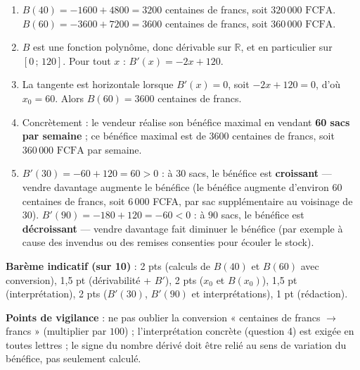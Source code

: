 \documentclass[11pt]{article}
\begin{document}
\begin{corrige}
\begin{enumerate}
\item $B(40)=-1600+4800=3200$ centaines de francs, soit $\boxed{320\,000\text{ FCFA}}$. $B(60)=-3600+7200=3600$ centaines de francs, soit $\boxed{360\,000\text{ FCFA}}$.
\item $B$ est une fonction polynôme, donc dérivable sur $\mathbb{R}$, et en particulier sur $[0\,;\,120]$. Pour tout $x$ : $B'(x)=-2x+120$.
\item La tangente est horizontale lorsque $B'(x)=0$, soit $-2x+120=0$, d'où $x_0=60$. Alors $B(60)=3600$ centaines de francs.
\item Concrètement : le vendeur réalise son bénéfice maximal en vendant \textbf{60 sacs par semaine} ; ce bénéfice maximal est de $3600$ centaines de francs, soit $\boxed{360\,000\text{ FCFA}}$ par semaine.
\item $B'(30)=-60+120=60>0$ : à $30$ sacs, le bénéfice est \textbf{croissant} — vendre davantage augmente le bénéfice (le bénéfice augmente d'environ $60$ centaines de francs, soit $6\,000$ FCFA, par sac supplémentaire au voisinage de $30$). $B'(90)=-180+120=-60<0$ : à $90$ sacs, le bénéfice est \textbf{décroissant} — vendre davantage fait diminuer le bénéfice (par exemple à cause des invendus ou des remises consenties pour écouler le stock).
\end{enumerate}
\textbf{Barème indicatif (sur 10)} : 2 pts (calculs de $B(40)$ et $B(60)$ avec conversion), 1,5 pt (dérivabilité + $B'$), 2 pts ($x_0$ et $B(x_0)$), 1,5 pt (interprétation), 2 pts ($B'(30)$, $B'(90)$ et interprétations), 1 pt (rédaction).

\textbf{Points de vigilance} : ne pas oublier la conversion « centaines de francs $\to$ francs » (multiplier par $100$) ; l'interprétation concrète (question 4) est exigée en toutes lettres ; le signe du nombre dérivé doit être relié au sens de variation du bénéfice, pas seulement calculé.
\end{corrige}
\end{document}
